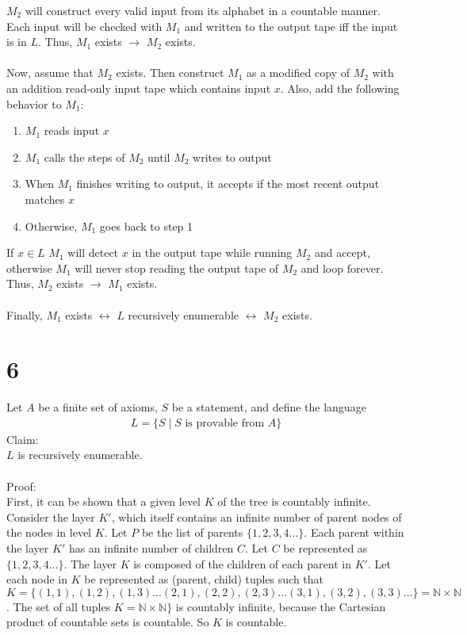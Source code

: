 \documentclass[letterpaper,notitlepage,twoside]{article}
\newcommand{\N}{\mathbb{N}} %
\begin{document}
$M_2$ will construct every valid input from its alphabet in a countable manner. Each input will be checked with $M_1$ and written to the output tape iff the input is in $L$. Thus, $M_1$ exists $\rightarrow$ $M_2$ exists.
\\
\\
Now, assume that $M_2$ exists. Then construct $M_1$ as a modified copy of $M_2$ with an addition read-only input tape which contains input $x$. Also, add the following behavior to $M_1$:
\begin{enumerate}
\item $M_1$ reads input $x$
\item $M_1$ calls the steps of $M_2$ until $M_2$ writes to output
\item When $M_1$ finishes writing to output, it accepts if the most recent output matches $x$
\item Otherwise, $M_1$ goes back to step 1
\end{enumerate}
If $x \in L$ $M_1$ will detect $x$ in the output tape while running $M_2$ and accept, otherwise $M_1$ will never stop reading the output tape of $M_2$ and loop forever. Thus, $M_2$ exists $\rightarrow$ $M_1$ exists.
\\
\\
Finally, $M_1$ exists $\leftrightarrow$ $L$ recursively enumerable $\leftrightarrow$ $M_2$ exists.

\section*{6}
Let $A$ be a finite set of axioms, $S$ be a statement, and define the language
\begin{align*}
L = \lbrace S \mid S \text{ is provable from } A \rbrace
\end{align*}
Claim:
\\
$L$ is recursively enumerable.
\\
\\
Proof:
\\
First, it can be shown that a given level $K$ of the tree is countably infinite. Consider the layer $K'$, which itself contains an infinite number of parent nodes of the nodes in level $K$.
Let $P$ be the list of parents $\{1, 2, 3, 4...\}$. Each parent within the layer $K'$ has an infinite number of children $C$. Let $C$ be represented as $\{1, 2, 3, 4...\}$.
The layer $K$ is composed of the children of each parent in $K'$. Let each node in $K$ be represented as (parent, child) tuples such that $K = \{(1,1), (1,2), (1,3)...(2,1),(2,2),(2,3)...(3,1),(3,2),(3,3)...\} = \N \times
 \N$.
The set of all tuples $K = \N \times \N\}$ is countably infinite, because the Cartesian product of countable sets is countable. So $K$ is countable.
\end{document}
